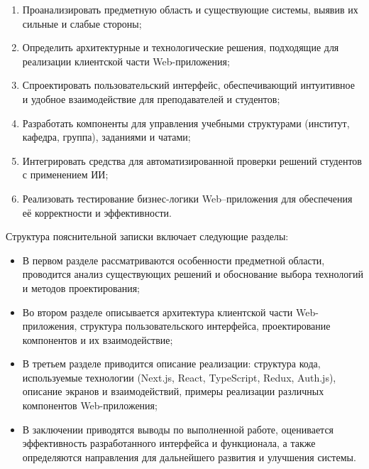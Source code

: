 \begin{enumerate}
  \item Проанализировать предметную область и существующие системы, выявив их сильные и слабые стороны;
  \item Определить архитектурные и технологические решения, подходящие для реализации клиентской части Web-приложения;
  \item Спроектировать пользовательский интерфейс, обеспечивающий интуитивное и удобное взаимодействие для преподавателей и студентов;
  \item Разработать компоненты для управления учебными структурами (институт, кафедра, группа), заданиями и чатами;
  \item Интегрировать средства для автоматизированной проверки решений студентов с применением ИИ;
  \item Реализовать тестирование бизнес-логики Web–приложения для обеспечения её корректности и эффективности.
\end{enumerate}

Структура пояснительной записки включает следующие разделы:
\begin{itemize}
  \item В первом разделе рассматриваются особенности предметной области, проводится анализ существующих решений и обоснование выбора технологий и методов проектирования;
  \item Во втором разделе описывается архитектура клиентской части Web-приложения, структура пользовательского интерфейса, проектирование компонентов и их взаимодействие;
  \item В третьем разделе приводится описание реализации: структура кода, используемые технологии (Next.js, React, TypeScript, Redux, Auth.js), описание экранов и взаимодействий, примеры реализации различных компонентов Web-приложения;
  \item В заключении приводятся выводы по выполненной работе, оценивается эффективность разработанного интерфейса и функционала, а также определяются направления для дальнейшего развития и улучшения системы.
\end{itemize}
